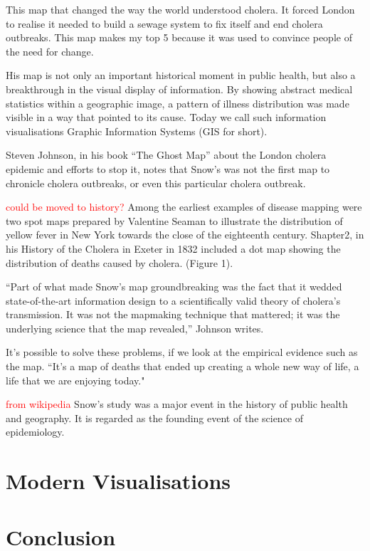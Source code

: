 \documentclass[12pt]{article}
\newcommand\todo[1]{\textcolor{red}{#1}}
\begin{document}
This map that changed the way the world understood cholera. It forced London to realise it needed to build a sewage system to fix itself and end cholera outbreaks. This map makes my top 5 because it was used to convince people of the need for change. \cite{top5}

His map is not only an important historical moment in public health, but also a breakthrough in the visual display of information. By showing abstract medical statistics within a geographic image, a pattern of illness distribution was made visible in a way that pointed to its cause. Today we call such information visualisations Graphic Information Systems (GIS for short). \cite{test}

Steven Johnson, in his book “The Ghost Map” about the London cholera epidemic and efforts to stop it, notes that Snow’s was not the first map to chronicle cholera outbreaks, or even this particular cholera outbreak. \cite{history}

\todo{could be moved to history?}
Among the earliest examples of disease mapping were
two spot maps prepared by Valentine Seaman to illustrate
the distribution of yellow fever in New York
towards the close of the eighteenth century. Shapter2, in
his History of the Cholera in Exeter in 1832 included a dot
map showing the distribution of deaths caused by
cholera. (Figure 1). \cite{howe1970some}

“Part of what made Snow’s map groundbreaking was the fact that it wedded state-of-the-art information design to a scientifically valid theory of cholera’s transmission. It was not the mapmaking technique that mattered; it was the underlying science that the map revealed,” Johnson writes. \cite{history}

It's possible to solve these problems, if we look at the empirical evidence such as the map. ``It's a  map of deaths that ended up creating a whole new way of life, a life that we are enjoying today." \cite{tedtalk}

\todo{from wikipedia}
Snow's study was a major event in the history of public health and geography. It is regarded as the founding event of the science of epidemiology.


\section{Modern Visualisations}

\section{Conclusion}


% 
% 




\end{document}
